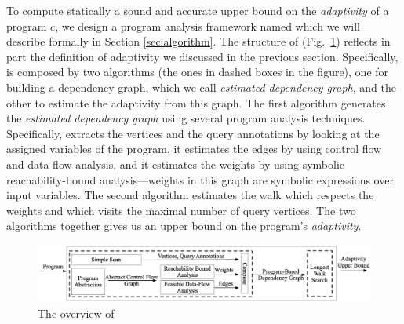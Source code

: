 To compute statically a sound and accurate upper bound on the \emph{adaptivity} of a program $c$,
we design a program analysis framework named {\THESYSTEM} which we will describe formally in Section \ref{sec:algorithm}. 
The structure of {\THESYSTEM} (Fig.~\ref{fig:adaptfun}) reflects in part the definition of adaptivity we discussed in the previous section. Specifically, {\THESYSTEM} is composed by two algorithms (the ones in dashed boxes in the figure), one for building a dependency graph, which we call \emph{estimated dependency graph}, and the other to estimate the adaptivity from this graph.  
The first algorithm generates the \emph{estimated dependency graph} using several program analysis techniques. Specifically,
 {\THESYSTEM} extracts the vertices and the query annotations by looking at the assigned variables of the program, it estimates the edges by using control flow and data flow analysis, and it estimates the weights by using symbolic reachability-bound analysis---weights in this graph are symbolic expressions over input variables. 
The second algorithm estimates the
walk which respects the weights and which visits the maximal number of query vertices.
The two algorithms together gives us an  upper bound on the program's \emph{adaptivity}.

 \begin{figure}
  \centering    
\includegraphics[width=1.0\columnwidth]{adapfun.png}
  \vspace{-0.8cm}
  \caption{The overview of {\THESYSTEM}}
  \label{fig:adaptfun}
  \vspace{-0.5cm}
\end{figure}

